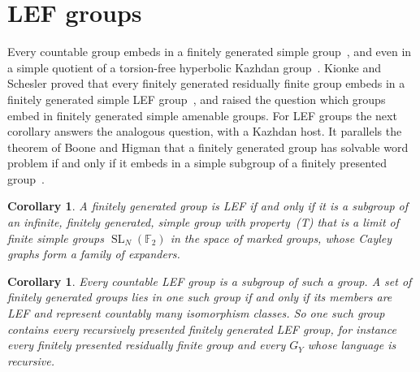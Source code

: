 \documentclass[11pt]{amsart}
\newtheorem{corollary}[theorem]{Corollary}
\newcommand{\F}{\mathbb F}
\newcommand{\SL}{\operatorname{SL}}
\begin{document}
\section{LEF groups}\label{sec:lef}

Every countable group embeds in a finitely generated simple
group~\cite{Gorjuskin,Schupp}, and even in a simple quotient of a
torsion-free hyperbolic Kazhdan group~\cite[Theorem~1.5]{CoulonFournierFacio}.
Kionke and Schesler proved that every finitely generated residually finite
group embeds in a finitely generated simple LEF
group~\cite[Theorem~1.2]{KionkeSchesler}, and raised the question which
groups embed in finitely generated simple amenable groups. For LEF groups
the next corollary answers the analogous question, with a Kazhdan host. It
parallels the theorem of Boone and Higman that a finitely generated group
has solvable word problem if and only if it embeds in a simple subgroup
of a finitely presented group~\cite{BooneHigman}.

\begin{corollary}\label{cor:lef}
A finitely generated group is LEF if and only if it is a subgroup of an
infinite, finitely generated, simple group with property~\textup{(T)}
that is a limit of finite simple groups $\SL_N(\F_2)$ in the space of
marked groups, whose Cayley graphs form a family of expanders.
\end{corollary}

\begin{corollary}\label{cor:host}
Every countable LEF group is a subgroup of such a group. A set of
finitely generated groups lies in one such group if and only if its
members are LEF and represent countably many isomorphism classes. So one
such group contains every recursively presented finitely generated LEF
group, for instance every finitely presented residually finite group and
every $G_Y$ whose language is recursive.
\end{corollary}
\end{document}
